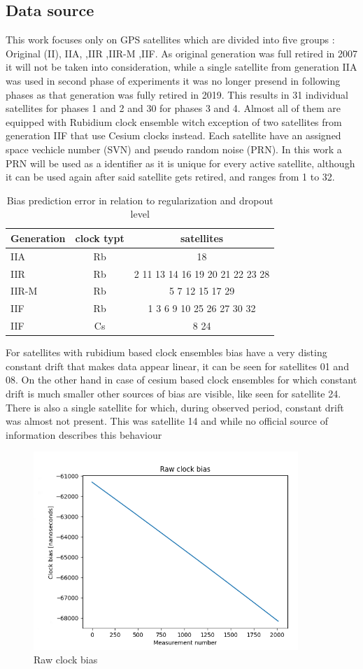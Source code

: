 \documentclass{kybernetika}
\begin{document}
\subsection{Data source}
This work focuses only on GPS satellites which are divided into five groups :
Original (II), IIA, ,IIR ,IIR-M ,IIF.
As original generation was full retired in 2007 it will not be taken into consideration, while
a single satellite from generation IIA was used in second phase of experiments it was no longer
presend in following phases as that generation was fully retired in 2019.
This results in 31 individual satellites for phases 1 and 2 and 30 for phases 3 and 4.
Almost all of them are equipped with Rubidium clock ensemble witch exception of two satellites
from generation IIF that use Cesium clocks instead.
Each satellite have an assigned space vechicle number (SVN) and pseudo random noise (PRN).
In this work a PRN will be used as a identifier as it is unique for every active satellite, 
although it can be used again after said satellite gets retired, and ranges from 1 to 32.
\begin{table}[ht] \label{table:2}
\parindent0pt
\caption{Bias prediction error in relation to regularization and dropout level}
\centering
\begin{tabular}{ l  c  c }
  \hline
  \hline
  Generation& clock typt& satellites\\  \hline
  IIA & Rb& 18\\  
  IIR & Rb& 2 11 13 14 16 19 20 21 22 23 28\\ 
  IIR-M & Rb& 5 7 12 15 17 29\\ 
  IIF & Rb& 1 3 6 9 10 25 26 27 30 32\\ 
  IIF & Cs& 8 24 \\ \hline \hline
 \end{tabular}
\end{table}
For satellites with rubidium based clock ensembles bias have a very disting constant drift
that makes data appear linear, it can be seen for satellites 01 and 08. 
On the other hand in case of cesium based clock ensembles for which constant drift is much 
smaller other sources of bias are visible, like seen for satellite 24.
There is also a single satellite for which, during observed period, constant drift was almost
not present. This was satellite 14 and while no official source of information describes this 
behaviour
\begin{figure}[ht] 
\centering
\includegraphics[width=10cm]{res/bias_raw.png}
\caption{Raw clock bias}
\label{fig:bias_raw}
\end{figure}
\end{document}
